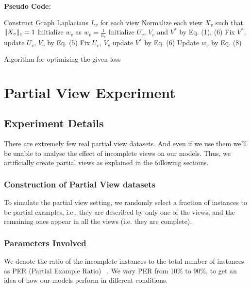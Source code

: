 \documentclass[a4paper]{article}
\begin{document}
	\noindent
	\textbf{Pseudo Code:}	
	\begin{algorithm}
		Construct Graph Laplacians $L_{v}$ for each view\;
		Normalize each view $X_{v}$ such that $\|X_{v}\|_{\text{\tiny1}} = 1 $\;
		Initialize $w_{v}$ as $w_{v}=${\tiny{${\frac{1}{n_{v}}}$}}\;
		Initialize  $U_{v}$, $V_{v}$ and $V^{*}$ by Eq. (1), (6)\;
		{
			{
				{
					Fix $V^{*}$, update $U_{v}$, $V_{v}$ by Eq. (5)\;
				}
			}
			Fix $U_{v}$, $V_{v}$ update $V^{*}$ by Eq. (6)\;		
			Update $w_{v}$ by Eq. (8)\;
		}						
		\caption{Algorithm for optimizing the given loss}
	\end{algorithm}

	\pagebreak

	\section{Partial View Experiment}	
	
	\subsection{Experiment Details}
	
	There are extremely few real partial view datasets. And even if we use them we'll be unable to analyse the effect of incomplete views on our models. Thus, we artificially create partial views as explained in the following sections.
	
	\subsubsection{Construction of Partial View datasets}	
To simulate the partial view setting, we randomly select a fraction of instances to be partial examples, i.e., they are described by only one of the views, and the remaining ones appear in all the views (i.e. they are complete).
	
	\subsubsection{Parameters Involved}	
	We denote the ratio of the incomplete instances to the total number of instances as PER (Partial Example Ratio) ~\cite{pvc15}. We vary PER from 10\% to 90\%, to get an idea of how our models perform in different conditions.	
	
\end{document}
